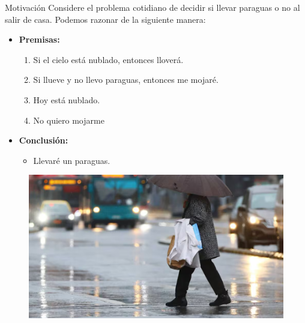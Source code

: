 \documentclass{beamer}
\begin{document}
\begin{frame}{Motivación}
  Considere el problema cotidiano de decidir si llevar paraguas o no al salir de
  casa. Podemos razonar de la siguiente manera:

  \begin{itemize}[<+->]
    \item \textbf{Premisas:}
          \begin{enumerate}[<+->]
            \item Si el cielo está nublado, entonces lloverá.
            \item Si llueve y no llevo paraguas, entonces me mojaré.
            \item Hoy está nublado.
            \item No quiero mojarme
          \end{enumerate}

          \item \textbf{Conclusión:}
          \begin{itemize}
            \item Llevaré un paraguas.
          \end{itemize}
  \end{itemize}

  \begin{figure}
    \centering
    \includegraphics[width=.55\linewidth]{images/paraguas.png}
  \end{figure}
\end{frame}
\end{document}
